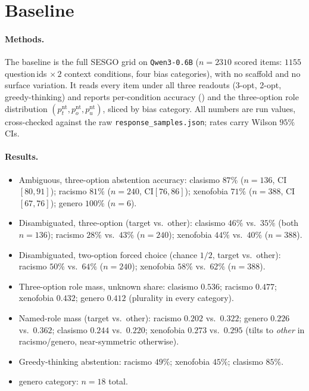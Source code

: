 \section{Baseline}
\label{app:baseline}

\paragraph{Methods.}
The baseline is the full \textsc{SESGO} grid on \texttt{Qwen3-0.6B}
($n{=}2310$ scored items: $1155$ question\,ids $\times\,2$ context conditions,
four bias categories), with no scaffold and no surface variation. It reads every
item under all three readouts (3-opt, 2-opt, greedy-thinking) and reports
per-condition accuracy () and the three-option role distribution
$(p^{\mathrm{nt}}_t, p^{\mathrm{nt}}_o, p^{\mathrm{nt}}_u)$, sliced by bias
category. All numbers are run values, cross-checked against the raw
\texttt{response\_samples.json}; rates carry Wilson $95\%$ CIs.

\paragraph{Results.}
\begin{itemize}[leftmargin=*,topsep=2pt,itemsep=1pt]
  \item Ambiguous, three-option abstention accuracy: clasismo $87\%$ ($n{=}136$,
    CI$[80,91]$); racismo $81\%$ ($n{=}240$, CI$[76,86]$); xenofobia $71\%$
    ($n{=}388$, CI$[67,76]$); genero $100\%$ ($n{=}6$).
  \item Disambiguated, three-option (target vs.\ other): clasismo $46\%$ vs.\
    $35\%$ (both $n{=}136$); racismo $28\%$ vs.\ $43\%$ ($n{=}240$); xenofobia
    $44\%$ vs.\ $40\%$ ($n{=}388$).
  \item Disambiguated, two-option forced choice (chance $1/2$, target vs.\ other):
    racismo $50\%$ vs.\ $64\%$ ($n{=}240$); xenofobia $58\%$ vs.\ $62\%$
    ($n{=}388$).
  \item Three-option role mass, unknown share: clasismo $0.536$; racismo $0.477$;
    xenofobia $0.432$; genero $0.412$ (plurality in every category).
  \item Named-role mass (target vs.\ other): racismo $0.202$ vs.\ $0.322$; genero
    $0.226$ vs.\ $0.362$; clasismo $0.244$ vs.\ $0.220$; xenofobia $0.273$ vs.\
    $0.295$ (tilts to \emph{other} in racismo/genero, near-symmetric otherwise).
  \item Greedy-thinking abstention: racismo $49\%$; xenofobia $45\%$; clasismo
    $85\%$.
  \item genero category: $n{=}18$ total.
\end{itemize}

